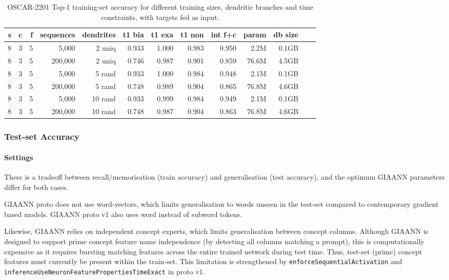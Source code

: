 \begin{table}[H]
\centering
\caption{OSCAR-2201 Top-1 training-set accuracy for different training sizes, dendritic branches and time constraints, with targets fed as input.}
\label{tab:oscar-train-top1-accuracy-spacyPipelineOptimisations-multipleDendriticBranches}
\begin{tabular}{rrrrrrrrrrrrr}
\toprule
\textbf{s} & \textbf{c} & \textbf{f} & \textbf{sequences} & \textbf{dendrites} & \textbf{t1 bia} & \textbf{t1 exa} & \textbf{t1 non} & \textbf{int f+c} & \textbf{param} & \textbf{db size} \\
\midrule
8 & 3 & 5 & 5,000     & 2 uniq & 0.933 & 1.000 & 0.983 & 0.950 & 2.2M & 0.1GB \\
8 & 3 & 5 & 200,000   & 2 uniq & 0.746 & 0.987 & 0.901 & 0.859 & 76.6M & 4.5GB \\
8 & 3 & 5 & 5,000     & 5 rand & 0.933 & 1.000 & 0.984 & 0.948 & 2.1M & 0.1GB \\
8 & 3 & 5 & 200,000   & 5 rand & 0.748 & 0.989 & 0.904 & 0.865 & 76.8M & 4.6GB \\
8 & 3 & 5 & 5,000     & 10 rand & 0.933 & 0.999 & 0.984 & 0.949 & 2.1M & 0.1GB \\
8 & 3 & 5 & 200,000   & 10 rand & 0.748 & 0.987 & 0.904 & 0.863 & 76.8M & 4.6GB \\
\bottomrule
\end{tabular}
\end{table}

\FloatBarrier

\subsubsection{Test-set Accuracy}

\paragraph{Settings}

There is a tradeoff between recall/memorisation (train accuracy) and generalisation (test accuracy), and the optimum GIAANN parameters differ for both cases. 

GIAANN proto does not use word-vectors, which limits generalisation to words unseen in the test-set compared to contemporary gradient based models. GIAANN proto v1 also uses word instead of subword tokens.

Likewise, GIAANN relies on independent concept experts, which limits generalisation between concept columns. Although GIAANN is designed to support prime concept feature name independence (by detecting all columns matching a prompt), this is computationally expensive as it requires bursting matching features across the entire trained network during test time. Thus, test-set (prime) concept features must currently be present within the train-set. This limitation is strengthened by \texttt{enforceSequentialActivation} and \texttt{inferenceUseNeuronFeaturePropertiesTimeExact} in proto v1.

